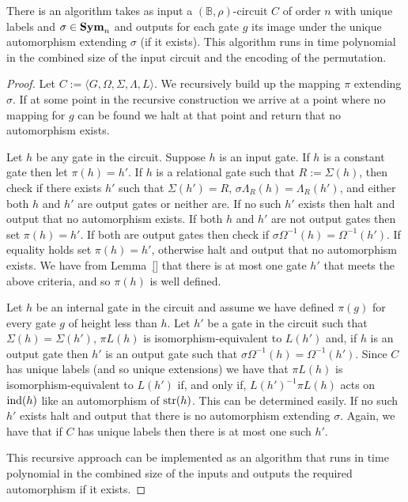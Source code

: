 \documentclass[../paper.tex]{subfiles}
\begin{document}
\begin{lem}
  There is an algorithm takes as input a $(\mathbb{B}, \rho)$-circuit $C$ of
  order $n$ with unique labels and $\sigma \in \text{\textbf{Sym}}_n$ and outputs for each gate
  $g$ its image under the unique automorphism extending $\sigma$ (if it exists).
  This algorithm runs in time polynomial in the combined size of the input
  circuit and the encoding of the permutation.
  \label{lem:compute-automorphisms}
\end{lem}
\begin{proof}
  Let $C := \langle G, \Omega, \Sigma, \Lambda, L \rangle$. We recursively build
  up the mapping $\pi$ extending $\sigma$. If at some point in the recursive
  construction we arrive at a point where no mapping for $g$ can be found we
  halt at that point and return that no automorphism exists.

  Let $h$ be any gate in the circuit. Suppose $h$ is an input gate. If $h$ is a
  constant gate then let $\pi (h) = h'$. If $h$ is a relational gate such that
  $R := \Sigma(h)$, then check if there exists $h'$ such that $\Sigma (h') = R$,
  $\sigma \Lambda_R(h) = \Lambda_R(h')$, and either both $h$ and $h'$ are output
  gates or neither are. If no such $h'$ exists then halt and output that no
  automorphism exists. If both $h$ and $h'$ are not output gates then set $\pi
  (h) = h'$. If both are output gates then check if $\sigma \Omega^{-1}(h) =
  \Omega^{-1}(h')$. If equality holds set $\pi(h) = h'$, otherwise halt and
  output that no automorphism exists. We have from Lemma~\ref{} that there is at
  most one gate $h'$ that meets the above criteria, and so $\pi(h)$ is well
  defined.

  Let $h$ be an internal gate in the circuit and assume we have defined $\pi
  (g)$ for every gate $g$ of height less than $h$. Let $h'$ be a gate in the
  circuit such that $\Sigma(h) = \Sigma (h')$, $\pi L(h)$ is
  isomorphism-equivalent to $L(h')$ and, if $h$ is an output gate then $h'$ is
  an output gate such that $\sigma \Omega^{-1}(h) = \Omega^{-1}(h')$. Since $C$
  has unique labels (and so unique extensions) we have that $\pi L(h)$ is
  isomorphism-equivalent to $L(h')$ if, and only if, $L(h')^{-1}\pi L(h)$ acts
  on $\text{\upshape ind}(h)$ like an automorphism of $\text{str}(h)$. This can be determined easily.
  If no such $h'$ exists halt and output that there is no automorphism extending
  $\sigma$. Again, we have that if $C$ has unique labels then there is at most
  one such $h'$.

  This recursive approach can be implemented as an algorithm that runs in time
  polynomial in the combined size of the inputs and outputs the required
  automorphism if it exists.
\end{proof}
\end{document}
